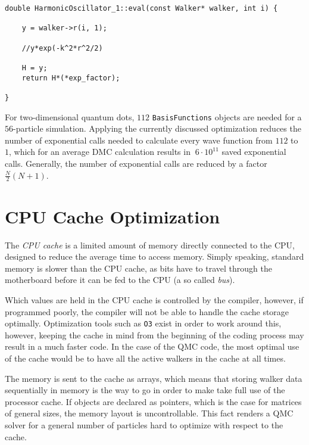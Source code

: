 \begin{lstlisting}[caption={The implementation of a single particle wave function. The pointer to the previously calculated exponential factor is simply accessed in line 8.}]
double HarmonicOscillator_1::eval(const Walker* walker, int i) {

    y = walker->r(i, 1);
    
    //y*exp(-k^2*r^2/2)
    
    H = y;
    return H*(*exp_factor);
    
}
\end{lstlisting}

For two-dimensional quantum dots, $112$ \verb+BasisFunctions+ objects are needed for a $56$-particle simulation. Applying the currently discussed optimization reduces the number of exponential calls needed to calculate every wave function from $112$ to $1$, which for an average DMC calculation results in $~6\cdot 10^{11}$ saved exponential calls. Generally, the number of exponential calls are reduced by a factor $\frac{N}{2}(N + 1)$.


\section{CPU Cache Optimization}
\label{sec:CPUcache}

The \textit{CPU cache} is a limited amount of memory directly connected to the CPU, designed to reduce the average time to access memory. Simply speaking, standard memory is slower than the CPU cache, as bits have to travel through the motherboard before it can be fed to the CPU (a so called \textit{bus}). 

Which values are held in the CPU cache is controlled by the compiler, however, if programmed poorly, the compiler will not be able to handle the cache storage optimally. Optimization tools such as \verb+O3+ exist in order to work around this, however, keeping the cache in mind from the beginning of the coding process may result in a much faster code. In the case of the QMC code, the most optimal use of the cache would be to have all the active walkers in the cache at all times. 

The memory is sent to the cache as arrays, which means that storing walker data sequentially in memory is the way to go in order to make take full use of the processor cache. If objects are declared as pointers, which is the case for matrices of general sizes, the memory layout is uncontrollable. This fact renders a QMC solver for a general number of particles hard to optimize with respect to the cache.







